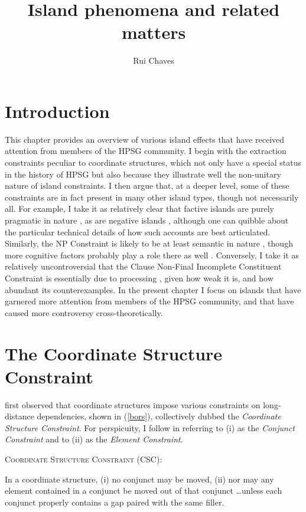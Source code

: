\documentclass[output=paper]{langsci/langscibook}
\author{Rui Chaves\affiliation{University at Buffalo, SUNY}}
\title{Island phenomena and related matters}
\begin{document}
\label{chap-islands}



\section{Introduction} 

 This chapter provides an overview of various island effects that have received attention from members of
 the HPSG community. I begin with the extraction constraints peculiar to coordinate structures, which not only have a special status in the history of HPSG but also because they
illustrate well the non-unitary nature of island constraints. I then argue that, at a deeper level, some of these constraints are in fact present in many other island types, though not necessarily all.
For example,
I take it as relatively clear that factive islands  are purely pragmatic in nature \citep{Oshima:2006:FIP:1761528.1761544}, as are negative islands \citep{abrusan,abrusanspec},
although one can quibble about the particular technical details of how such accounts are best articulated. 
Similarly,  the NP Constraint is likely to be at least semantic in nature \citep{kuno87,godard92,dubinsky2009}, though more cognitive factors probably play a role there as well \citep{Dean}. Conversely, I take it as relatively uncontroversial that the Clause Non-Final Incomplete Constituent  Constraint  is essentially due to processing  \citep{lev91,fodor92}, given how weak it is, and how abundant its counterexamples. In the present chapter I focus on islands that have garnered more attention from members of the HPSG community, and that have caused more 
 controversy cross-theoretically.

\section{The Coordinate Structure Constraint}

\cite{Ross67} first observed that coordinate structures
impose various constraints on long-distance dependencies, shown in  (\ref{bors}), collectively dubbed the
\emph{Coordinate Structure Constraint}. For perspicuity,  I  follow \citet{grosu73} in referring to (i) as the \emph{Conjunct Constraint} and to (ii) as the \emph{Element Constraint}.

\ea 
\textsc{Coordinate Structure Constraint} (CSC):

In a coordinate structure, (i) no conjunct may be moved,
(ii) nor may any element contained in a conjunct be moved out
of that conjunct
\ldots unless each conjunct properly contains a gap paired with the same filler.
\z \label{bors}
\end{document}
